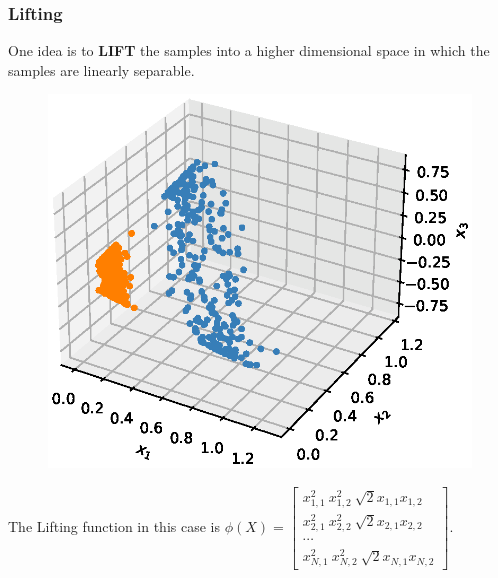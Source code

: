 \documentclass[10pt]{../formats/RU}
\begin{document}
\begin{frame}
  \frametitle{Lifting}
  One idea is to \textbf{LIFT} the samples into a higher dimensional space in which the samples are linearly separable.
  \begin{figure}
    \includegraphics[height=0.45\textheight]{./figs/3d_poly_circle.eps}%
  \end{figure}
  The Lifting function in this case is 
  $
  \phi(X) = {
    \begin{bmatrix}
      x_{1,1}^2 \ x_{1,2}^2 \ \sqrt{2}x_{1,1}x_{1,2} \\
      x_{2,1}^2 \ x_{2,2}^2 \ \sqrt{2}x_{2,1}x_{2,2} \\
      \cdots \\
      x_{N,1}^2 \ x_{N,2}^2 \ \sqrt{2}x_{N,1}x_{N,2} 
    \end{bmatrix}
  }
  $.
\end{frame}
\end{document}
